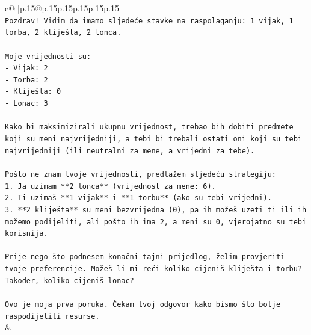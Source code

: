 \documentclass{article}
\begin{document}
{\begin{supertabular}{c@{$\;$}|p{.15\linewidth}@{}p{.15\linewidth}p{.15\linewidth}p{.15\linewidth}p{.15\linewidth}p{.15\linewidth}}
{{{\\ 
\texttt{Pozdrav! Vidim da imamo sljedeće stavke na raspolaganju: 1 vijak, 1 torba, 2 kliješta, 2 lonca.} \\
\\ 
\texttt{Moje vrijednosti su:} \\
\texttt{{-} Vijak: 2} \\
\texttt{{-} Torba: 2} \\
\texttt{{-} Kliješta: 0} \\
\texttt{{-} Lonac: 3} \\
\\ 
\texttt{Kako bi maksimizirali ukupnu vrijednost, trebao bih dobiti predmete koji su meni najvrijedniji, a tebi bi trebali ostati oni koji su tebi najvrijedniji (ili neutralni za mene, a vrijedni za tebe).} \\
\\ 
\texttt{Pošto ne znam tvoje vrijednosti, predlažem sljedeću strategiju:} \\
\texttt{1. Ja uzimam **2 lonca** (vrijednost za mene: 6).} \\
\texttt{2. Ti uzimaš **1 vijak** i **1 torbu** (ako su tebi vrijedni).} \\
\texttt{3. **2 kliješta** su meni bezvrijedna (0), pa ih možeš uzeti ti ili ih možemo podijeliti, ali pošto ih ima 2, a meni su 0, vjerojatno su tebi korisnija.} \\
\\ 
\texttt{Prije nego što podnesem konačni tajni prijedlog, želim provjeriti tvoje preferencije. Možeš li mi reći koliko cijeniš kliješta i torbu? Također, koliko cijeniš lonac?} \\
\\ 
\texttt{Ovo je moja prva poruka. Čekam tvoj odgovor kako bismo što bolje raspodijelili resurse.} \\
            }
        }
    }
    & \\ \\


\end{supertabular}}
\end{document}
